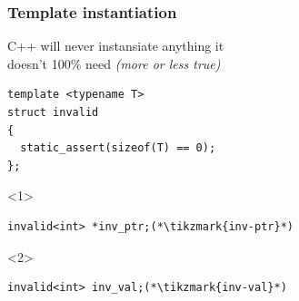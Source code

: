 \documentclass[14pt]{beamer}
\begin{document}
\begin{frame}[fragile]
  \frametitle{Template instantiation}

  C++ will never instansiate anything it \\ doesn't 100\% need
  {\itshape\changefontsize{10pt}(more or less true)}

  \vspace{.25cm}

  \begin{lstlisting}[basicstyle=\codefontsize{12pt}]
template <typename T>
struct invalid
{
  static_assert(sizeof(T) == 0);
};
  \end{lstlisting}

  \begin{overlayarea}{\textwidth}{1cm}

    \begin{onlyenv}<1>
      \begin{lstlisting}[basicstyle=\codefontsize{12pt}]
invalid<int> *inv_ptr;(*\tikzmark{inv-ptr}*)
      \end{lstlisting}

      \nointerlineskip
    \end{onlyenv}

    \begin{onlyenv}<2>
      \begin{lstlisting}[basicstyle=\codefontsize{12pt}]
invalid<int> inv_val;(*\tikzmark{inv-val}*)
      \end{lstlisting}

      \nointerlineskip
    \end{onlyenv}
    
  \end{overlayarea}

\end{frame}
\end{document}
